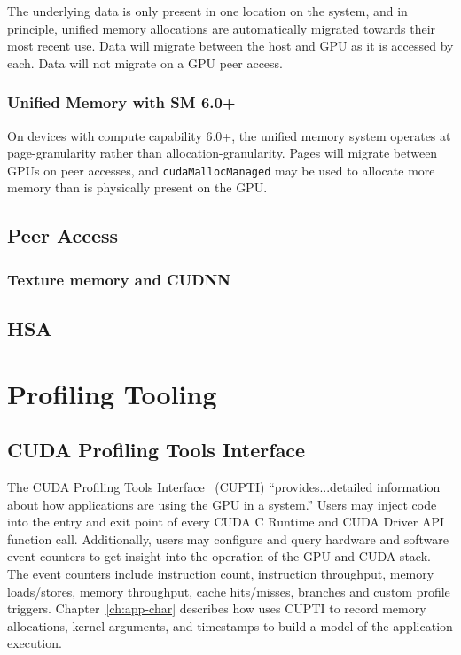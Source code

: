 The underlying data is only present in one location on the system, and in principle, unified memory allocations are automatically migrated towards their most recent use.
Data will migrate between the host and GPU as it is accessed by each.
Data will not migrate on a GPU peer access.

\subsubsection{Unified Memory with SM 6.0+}

On devices with compute capability 6.0+, the unified memory system operates at page-granularity rather than allocation-granularity.
Pages will migrate between GPUs on peer accesses, and \texttt{cudaMallocManaged} may be used to allocate more memory than is physically present on the GPU.


\subsection{Peer Access}

\subsubsection{Texture memory and CUDNN}

\subsection{HSA}
\label{sec:hsa}


\section{Profiling Tooling}

\subsection{CUDA Profiling Tools Interface}
\label{sec:cupti}

The CUDA Profiling Tools Interface~\cite{nvidia2017cupti} (CUPTI) ``provides...detailed information about how applications are using the GPU in a system.''
Users may inject code into the entry and exit point of every CUDA C Runtime and CUDA Driver API function call.
Additionally, users may configure and query hardware and software event counters to get insight into the operation of the GPU and CUDA stack.
The event counters include instruction count, instruction throughput, memory loads/stores, memory throughput, cache hits/misses, branches and custom profile triggers.
Chapter~\ref{ch:app-char} describes how  uses CUPTI to record memory allocations, kernel arguments, and timestamps to build a model of the application execution.

